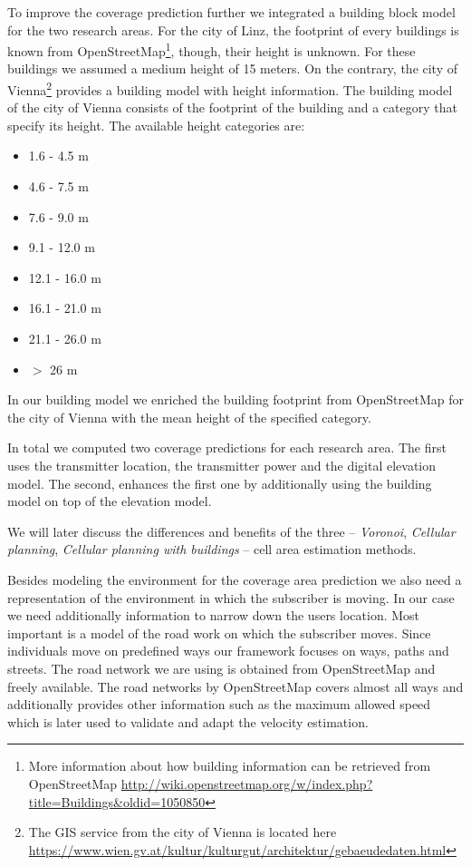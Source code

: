 \documentclass[twocolumn]{bmcart}%
\begin{document}
To improve the coverage prediction further we integrated a building block model for the two research areas. For the city of Linz, the footprint of every buildings is known from OpenStreetMap\footnote{More information about how building information can be retrieved from OpenStreetMap \url{http://wiki.openstreetmap.org/w/index.php?title=Buildings&oldid=1050850}}, though, their height is unknown. For these buildings we assumed a medium height of 15 meters. On the contrary, the city of Vienna\footnote{The GIS service from the city of Vienna is located here \url{https://www.wien.gv.at/kultur/kulturgut/architektur/gebaeudedaten.html}} provides a building model with height information. The building model of the city of Vienna consists of the footprint of the building and a category that specify its height. The available height categories are: 
\begin{itemize}
	\item 1.6 - 4.5 m
	\item 4.6 - 7.5 m
	\item 7.6 - 9.0 m
	\item 9.1 - 12.0 m
	\item 12.1 - 16.0 m
	\item 16.1 - 21.0 m
	\item 21.1 - 26.0 m
	\item $>$ 26 m
\end{itemize}

In our building model we enriched the building footprint from OpenStreetMap for the city of Vienna with the mean height of the specified category.

In total we computed two coverage predictions for each research area. The first uses the transmitter location, the transmitter power and the digital elevation model. The second, enhances the first one by additionally using the building model on top of the elevation model.

We will later discuss the differences and benefits of the three -- \emph{Voronoi}, \emph{Cellular planning}, \emph{Cellular planning with buildings} -- cell area estimation methods.\newline

Besides modeling the environment for the coverage area prediction we also need a representation of the environment in which the subscriber is moving. In our case we need additionally information to narrow down the users location. Most important is a model of the road work on which the subscriber moves. Since individuals move on predefined ways our framework focuses on ways, paths and streets. The road network we are using is obtained from OpenStreetMap and freely available. The road networks by OpenStreetMap covers almost all ways and additionally provides other information such as the maximum allowed speed which is later used to validate and adapt the velocity estimation.\newline
\end{document}
